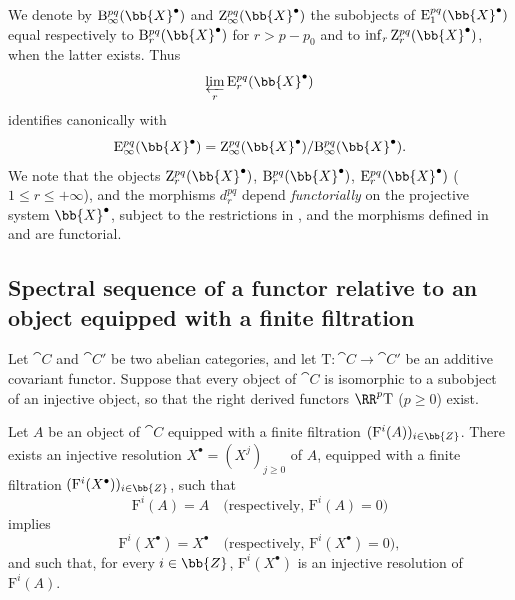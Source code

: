 \begin{env}[13.5.7]
\label{0.13.5.7}
We denote by
$\mathrm{B}_\infty^{pq}(\bb{X}^\bullet)$ and
$\mathrm{Z}_\infty^{pq}(\bb{X}^\bullet)$ the subobjects of
$\mathrm{E}_1^{pq}(\bb{X}^\bullet)$ equal respectively to
$\mathrm{B}_r^{pq}(\bb{X}^\bullet)$ for $r>p-p_0$ and to
$\inf_r\mathrm{Z}_r^{pq}(\bb{X}^\bullet)$, when the latter exists.
Thus
\[
  \varprojlim_r\mathrm{E}_r^{pq}(\bb{X}^\bullet)
\]
identifies canonically with
\[
  \mathrm{E}_\infty^{pq}(\bb{X}^\bullet)
  =
  \mathrm{Z}_\infty^{pq}(\bb{X}^\bullet)/
  \mathrm{B}_\infty^{pq}(\bb{X}^\bullet).
\]
We note that the objects
$\mathrm{Z}_r^{pq}(\bb{X}^\bullet)$,
$\mathrm{B}_r^{pq}(\bb{X}^\bullet)$,
$\mathrm{E}_r^{pq}(\bb{X}^\bullet)$
($1\leq r\leq+\infty$), and the morphisms $d_r^{pq}$ depend
\emph{functorially} on the projective system $\bb{X}^\bullet$, subject
to the restrictions in , and the morphisms defined in
 and  are functorial.
\end{env}

\subsection{Spectral sequence of a functor relative to an object equipped with a finite filtration}
\label{subsection:0.13.6}

\begin{env}[13.6.1]
\label{0.13.6.1}
Let $\cat{C}$ and $\cat{C}'$ be two abelian categories, and let
$\mathrm{T}:\cat{C}\longrightarrow\cat{C}'$ be an additive covariant
functor.
Suppose that every object of $\cat{C}$ is isomorphic to a subobject of
an injective object, so that the right derived functors
$\RR^p\mathrm{T}$ ($p\geq0$) exist.
\end{env}

\begin{lemma}[13.6.2]
\label{0.13.6.2}
Let $A$ be an object of $\cat{C}$ equipped with a finite filtration
$(\mathrm{F}^i(A))_{i\in\bb{Z}}$.
There exists an injective resolution
$X^\bullet=(X^j)_{j\geq0}$ of $A$, equipped with a finite filtration
$(\mathrm{F}^i(X^\bullet))_{i\in\bb{Z}}$, such that
\[
  \mathrm{F}^i(A)=A
  \quad\text{(respectively, }\mathrm{F}^i(A)=0\text{)}
\]
implies
\[
  \mathrm{F}^i(X^\bullet)=X^\bullet
  \quad\text{(respectively, }\mathrm{F}^i(X^\bullet)=0\text{)},
\]
and such that, for every $i\in\bb{Z}$,
$\mathrm{F}^i(X^\bullet)$ is an injective resolution of
$\mathrm{F}^i(A)$.
\end{lemma}

